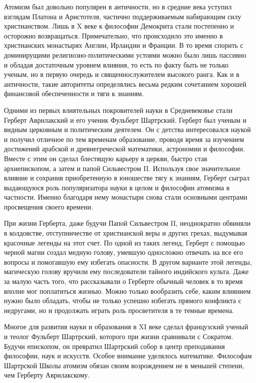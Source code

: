 Атомизм был довольно популярен в античности, но в средние века уступил взглядам Платона и Аристотеля, частично поддерживаемым набирающим силу христианством.
Лишь в X веке к философии Демокрита стали постепенно и осторожно возвращаться.
Примечательно, что происходило это именно в христианских монастырях Англии, Ирландии и Франции.
В то время спорить с доминирущими религиозно-политическими устоями можно было лишь пассивно и обладая достаточным уровнем влияния, то есть по факту быть не только ученым, но в первую очередь и священнослужителем высокого ранга.
Как и в античности, такие авторитеты определялись весьма редким сочетанием хорошей финансовой обеспеченности и тяги к знаниям.

Одними из первых влиятельных покровителей науки в Средневековье стали Герберт Аврилакский и его ученик Фульберт Шартрский.
Герберт был ученым и видным церковным и политическим деятелем.
Он с детства интересовался наукой и получил отличное по тем временам образование, проводя время за изучением достижений арабской и древнегреческой математики, астрономии и философии.
Вместе с этим он сделал блестящую карьеру в церкви, быстро став архиепископом, а затем и папой Сильвестром II.
Используя свое значительное влияние и сохранив приобретенную в юношестве тягу к знаниям, Герберт сыграл выдающуюся роль популяризатора науки в целом и философии атомизма в частности.
Именно благодаря нему монастыри снова стали основными центрами просвещения своего времени.

При жизни Герберта, даже будучи Папой Сильвестром II, неоднократно обвиняли в колдовстве, отступничестве от христианской веры и других грехах, выдумывая красочные легенды на этот счет.
По одной из таких легенд, Герберт с помощью черной магии создал медную голову, умевшую односложно отвечать на все его вопросы и помогавшую ему избегать опасности.
В другом варианте этой легенды, магическую голову вручили ему последователи тайного индийского культа.
Даже за малую часть того, что рассказывали о Герберте обычный человек в то время вполне мог поплатиться жизнью.
Можно только вообразить себе, каким влиянием нужно было обладать, чтобы не только успешно избегать прямого конфликта с недругами, но и продолжать играть роль просветителя в те темные времена.

Многое для развития науки и образования в XI веке сделал французский ученый и теолог Фульберт Шартрский, которого при жизни сравнивали с Сократом.
Будучи епископом, он превратил Шартрский собор в центр преподавания философии, наук и искусств.
Особое внимание уделялось математике.
Философам Шартрской Школы атомизм обязан своим возрождением не в меньшей степени, чем Герберту Аврилакскому.

